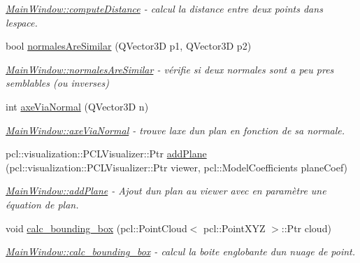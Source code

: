 \begin{DoxyCompactItemize}
\begin{DoxyCompactList}\small\item\em \hyperlink{classMainWindow_a5cf7c81626d682f087f5143605342f52}{Main\+Window\+::compute\+Distance} -\/ calcul la distance entre deux points dans l\textquotesingle{}espace. \end{DoxyCompactList}\item 
bool \hyperlink{classMainWindow_aa630d558c19d9e93bc8f3f0e2f591163}{normales\+Are\+Similar} (Q\+Vector3D p1, Q\+Vector3D p2)
\begin{DoxyCompactList}\small\item\em \hyperlink{classMainWindow_aa630d558c19d9e93bc8f3f0e2f591163}{Main\+Window\+::normales\+Are\+Similar} -\/ vérifie si deux normales sont a peu pres semblables (ou inverses) \end{DoxyCompactList}\item 
int \hyperlink{classMainWindow_a271a1410c7952fbdb4aa418acd38a52f}{axe\+Via\+Normal} (Q\+Vector3D n)
\begin{DoxyCompactList}\small\item\em \hyperlink{classMainWindow_a271a1410c7952fbdb4aa418acd38a52f}{Main\+Window\+::axe\+Via\+Normal} -\/ trouve l\textquotesingle{}axe d\textquotesingle{}un plan en fonction de sa normale. \end{DoxyCompactList}\item 
pcl\+::visualization\+::\+P\+C\+L\+Visualizer\+::\+Ptr \hyperlink{classMainWindow_abe57e522ecabb790bbb41ce813ea2a70}{add\+Plane} (pcl\+::visualization\+::\+P\+C\+L\+Visualizer\+::\+Ptr viewer, pcl\+::\+Model\+Coefficients plane\+Coef)
\begin{DoxyCompactList}\small\item\em \hyperlink{classMainWindow_abe57e522ecabb790bbb41ce813ea2a70}{Main\+Window\+::add\+Plane} -\/ Ajout d\textquotesingle{}un plan au viewer avec en paramètre une équation de plan. \end{DoxyCompactList}\item 
void \hyperlink{classMainWindow_a0e33f00b6a6dc0c09dbc75d7396b7094}{calc\+\_\+bounding\+\_\+box} (pcl\+::\+Point\+Cloud$<$ pcl\+::\+Point\+X\+YZ $>$\+::Ptr cloud)
\begin{DoxyCompactList}\small\item\em \hyperlink{classMainWindow_a0e33f00b6a6dc0c09dbc75d7396b7094}{Main\+Window\+::calc\+\_\+bounding\+\_\+box} -\/ calcul la boite englobante d\textquotesingle{}un nuage de point. \end{DoxyCompactList}\item 

\end{DoxyCompactItemize}
